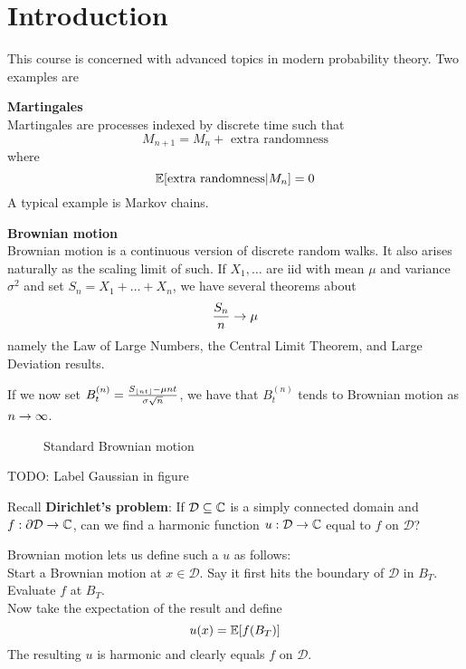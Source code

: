 \documentclass{article}
\newcommand{\brownian}[5]{%
\draw[#4] (0,0)
\foreach \x in {1,...,#1}
{   -- ++(#2,rand*#3)
}
node[right] {#5};
}
\begin{document}
\maketitle

\tableofcontents

\clearpage

\section{Introduction}

\newlec

This course is concerned with advanced topics in modern probability theory. Two examples are

{\bf Martingales} \\
Martingales are processes indexed by discrete time such that
$$M_{n + 1} = M_n + \text{ extra randomness}$$
where
$$\mathbb E[\text{extra randomness} | M_n] = 0$$
A typical example is Markov chains.

{\bf Brownian motion} \\
Brownian motion is a continuous version of discrete random walks. It also arises naturally as the scaling limit of such. If $X_1, \dots$ are iid with mean $\mu$ and variance $\sigma^2$ and set $S_n = X_1 + \dots + X_n$, we have several theorems about
$$\frac{S_n}n \rightarrow \mu$$
namely the Law of Large Numbers, the Central Limit Theorem, and Large Deviation results.

If we now set $B_t^{(n)} = \frac{S_{\left\lfloor nt\right\rfloor} - \mu nt}{\sigma\sqrt n}$, we have that $B_t^{(n)}$ tends to Brownian motion as $n \rightarrow \infty$.
\begin{figure}[h]
  \centering
  \caption{Standard Brownian motion}\label{fig:std-brown}
\end{figure}

TODO: Label Gaussian in figure

Recall {\bf Dirichlet's problem}: If $\mathcal D \subseteq \mathbb C$ is a simply connected domain and $f : \partial \mathcal D \rightarrow \mathbb C$, can we find a harmonic function $u : \mathcal D \rightarrow \mathbb C$ equal to $f$ on $\mathcal D$?

Brownian motion lets us define such a $u$ as follows: \\
Start a Brownian motion at $x \in \mathcal D$. Say it first hits the boundary of $\mathcal D$ in $B_T$. Evaluate $f$ at $B_T$. \\
Now take the expectation of the result and define
$$u(x) = \mathbb E[f(B_T)]$$
The resulting $u$ is harmonic and clearly equals $f$ on $\mathcal D$.
\end{document}

